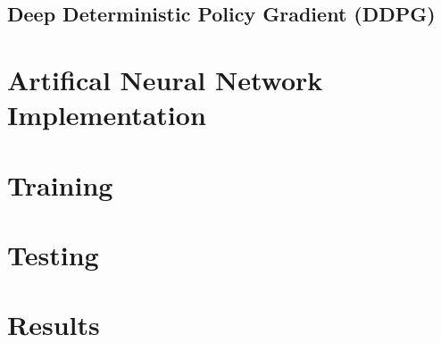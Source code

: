 \subsection{Deep Deterministic Policy Gradient (DDPG)}





\section{Artifical Neural Network Implementation}

\section{Training}

\section{Testing}

\section{Results}

